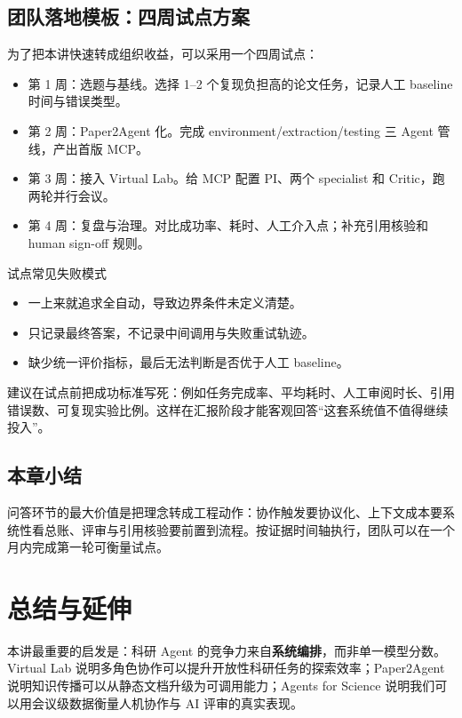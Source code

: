 \documentclass[a4paper]{article}
\begin{document}
\subsection{团队落地模板：四周试点方案}

为了把本讲快速转成组织收益，可以采用一个四周试点：

\begin{itemize}
    \item 第 1 周：选题与基线。选择 1--2 个复现负担高的论文任务，记录人工 baseline 时间与错误类型。
    \item 第 2 周：Paper2Agent 化。完成 environment/extraction/testing 三 Agent 管线，产出首版 MCP。
    \item 第 3 周：接入 Virtual Lab。给 MCP 配置 PI、两个 specialist 和 Critic，跑两轮并行会议。
    \item 第 4 周：复盘与治理。对比成功率、耗时、人工介入点；补充引用核验和 human sign-off 规则。
\end{itemize}

\begin{warningbox}{试点常见失败模式}
\begin{itemize}
    \item 一上来就追求全自动，导致边界条件未定义清楚。
    \item 只记录最终答案，不记录中间调用与失败重试轨迹。
    \item 缺少统一评价指标，最后无法判断是否优于人工 baseline。
\end{itemize}
\end{warningbox}

建议在试点前把成功标准写死：例如任务完成率、平均耗时、人工审阅时长、引用错误数、可复现实验比例。这样在汇报阶段才能客观回答``这套系统值不值得继续投入''。

\subsection{本章小结}

问答环节的最大价值是把理念转成工程动作：协作触发要协议化、上下文成本要系统性看总账、评审与引用核验要前置到流程。按证据时间轴执行，团队可以在一个月内完成第一轮可衡量试点。

\section{总结与延伸}

本讲最重要的启发是：科研 Agent 的竞争力来自\textbf{系统编排}，而非单一模型分数。Virtual Lab 说明多角色协作可以提升开放性科研任务的探索效率；Paper2Agent 说明知识传播可以从静态文档升级为可调用能力；Agents for Science 说明我们可以用会议级数据衡量人机协作与 AI 评审的真实表现。
\end{document}
